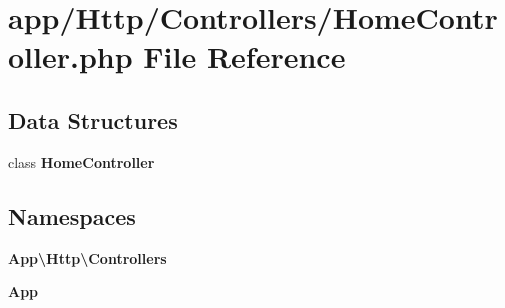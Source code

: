 \section{app/\+Http/\+Controllers/\+Home\+Controller.php File Reference}
\label{_home_controller_8php}
\subsection*{Data Structures}
\begin{DoxyCompactItemize}
\item 
class {\bf Home\+Controller}
\end{DoxyCompactItemize}
\subsection*{Namespaces}
\begin{DoxyCompactItemize}
\item 
 {\bf App\textbackslash{}\+Http\textbackslash{}\+Controllers}
\item 
 {\bf App}
\end{DoxyCompactItemize}
